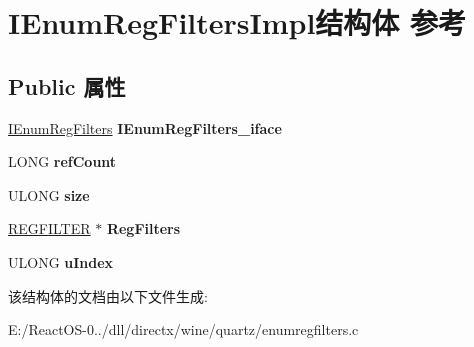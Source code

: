 \hypertarget{struct_i_enum_reg_filters_impl}{}\section{I\+Enum\+Reg\+Filters\+Impl结构体 参考}
\label{struct_i_enum_reg_filters_impl}
\subsection*{Public 属性}
\begin{DoxyCompactItemize}
\item 
\mbox{\label{struct_i_enum_reg_filters_impl_a2e25d76808edf1a836d86ec24d5b734b}} 
\hyperlink{interface_i_enum_reg_filters}{I\+Enum\+Reg\+Filters} {\bfseries I\+Enum\+Reg\+Filters\+\_\+iface}
\item 
\mbox{\label{struct_i_enum_reg_filters_impl_a1cb0ff1dea0bc6cfd725ad3f861cb01a}} 
L\+O\+NG {\bfseries ref\+Count}
\item 
\mbox{\label{struct_i_enum_reg_filters_impl_a7bf4e4a3047f6f3cff3bafee451786be}} 
U\+L\+O\+NG {\bfseries size}
\item 
\mbox{\label{struct_i_enum_reg_filters_impl_afa70f962d61cea507eb846b98011ac45}} 
\hyperlink{struct_r_e_g_f_i_l_t_e_r}{R\+E\+G\+F\+I\+L\+T\+ER} $\ast$ {\bfseries Reg\+Filters}
\item 
\mbox{\label{struct_i_enum_reg_filters_impl_ae139013926fa70ec36718f0b306fc91f}} 
U\+L\+O\+NG {\bfseries u\+Index}
\end{DoxyCompactItemize}


该结构体的文档由以下文件生成\+:\begin{DoxyCompactItemize}
\item 
E\+:/\+React\+O\+S-\/0../dll/directx/wine/quartz/enumregfilters.\+c\end{DoxyCompactItemize}
